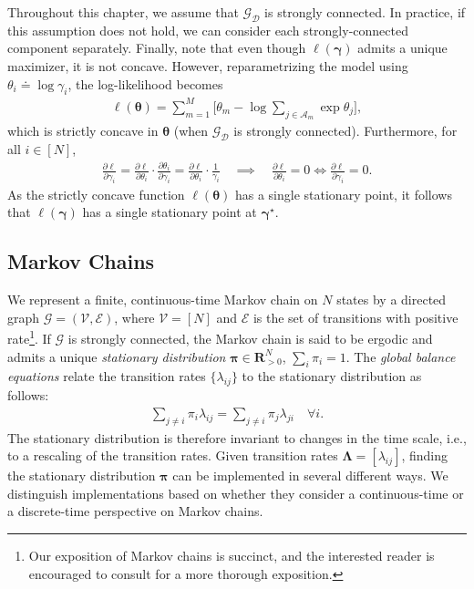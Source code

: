 Throughout this chapter, we assume that $\mathcal{G}_{\mathcal{D}}$ is strongly connected.
In practice, if this assumption does not hold, we can consider each strongly-connected component separately.
Finally, note that even though $\ell(\bm{\gamma})$ admits a unique maximizer, it is not concave.
However, reparametrizing the model using $\theta_i \doteq \log \gamma_i$, the log-likelihood becomes
\begin{align*}
\ell(\bm{\theta}) = \sum_{m = 1}^M \bigg[ \theta_m - \log{\sum_{j \in \mathcal{A}_m} \exp \theta_j} \bigg],
\end{align*}
which is strictly concave in $\bm{\theta}$ (when $\mathcal{G}_{\mathcal{D}}$ is strongly connected).
Furthermore, for all $i \in [N]$,
\begin{align*}
\frac{\partial \ell}{\partial \gamma_i}
  = \frac{\partial \ell}{\partial \theta_i} \cdot \frac{\partial \theta_i}{\partial \gamma_i}
  = \frac{\partial \ell}{\partial \theta_i} \cdot \frac{1}{\gamma_i}
\quad \implies \quad
\frac{\partial \ell}{\partial \theta_i} = 0 \iff \frac{\partial \ell}{\partial \gamma_i} = 0.
\end{align*}
As the strictly concave function $\ell({\bm{\theta}})$ has a single stationary point, it follows that $\ell(\bm{\gamma})$ has a single stationary point at $\bm{\gamma}^\star$.


\subsection{Markov Chains}

We represent a finite, continuous-time Markov chain on $N$ states by a directed graph $\mathcal{G} = (\mathcal{V}, \mathcal{E})$, where $\mathcal{V} = [N]$ and $\mathcal{E}$ is the set of transitions with positive rate\footnote{%
Our exposition of Markov chains is succinct, and the interested reader is encouraged to consult \citet{levin2008markov} for a more thorough exposition.}.
If $\mathcal{G}$ is strongly connected, the Markov chain is said to be ergodic and admits a unique \emph{stationary distribution} $\bm{\pi} \in \mathbf{R}^N_{>0}$, $\sum_i \pi_i = 1$.
The \emph{global balance equations} relate the transition rates $\{ \lambda_{ij} \}$ to the stationary distribution as follows:
\begin{align}
\label{fi:eq:balance}
\sum_{j \ne i} \pi_i \lambda_{ij} = \sum_{j \ne i} \pi_j \lambda_{ji} \quad \forall i.
\end{align}
The stationary distribution is therefore invariant to changes in the time scale, i.e., to a rescaling of the transition rates.
Given transition rates $\bm{\Lambda} = [\lambda_{ij}]$, finding the stationary distribution $\bm{\pi}$ can be implemented in several different ways.
We distinguish implementations based on whether they consider a continuous-time or a discrete-time perspective on Markov chains.


